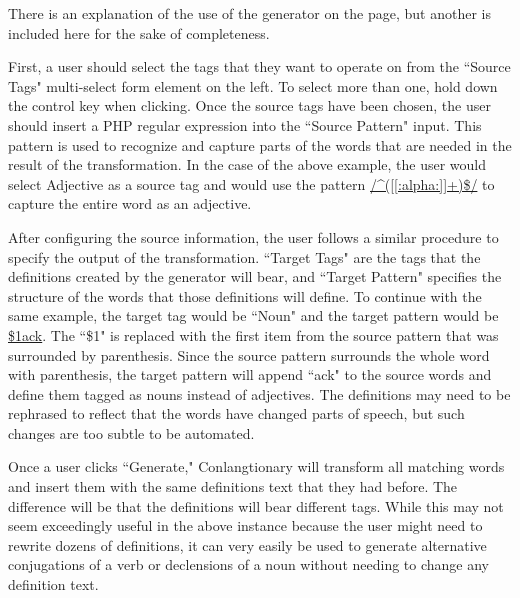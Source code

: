 There is an explanation of the use of the generator on the page, but another is included here for the sake of completeness.

First, a user should select the tags that they want to operate on from the ``Source Tags" multi-select form element on the left. To select more than one, hold down the control key when clicking. Once the source tags have been chosen, the user should insert a PHP regular expression into the ``Source Pattern" input. This pattern is used to recognize and capture parts of the words that are needed in the result of the transformation. In the case of the above example, the user would select Adjective as a source tag and would use the pattern \url{/^([[:alpha:]]+)$/} to capture the entire word as an adjective.

After configuring the source information, the user follows a similar procedure to specify the output of the transformation. ``Target Tags" are the tags that the definitions created by the generator will bear, and ``Target Pattern" specifies the structure of the words that those definitions will define. To continue with the same example, the target tag would be ``Noun" and the target pattern would be \url{$1ack}. The ``\$1" is replaced with the first item from the source pattern that was surrounded by parenthesis. Since the source pattern surrounds the whole word with parenthesis, the target pattern will append ``ack" to the source words and define them tagged as nouns instead of adjectives. The definitions may need to be rephrased to reflect that the words have changed parts of speech, but such changes are too subtle to be automated.

Once a user clicks ``Generate," Conlangtionary will transform all matching words and insert them with the same definitions text that they had before. The difference will be that the definitions will bear different tags. While this may not seem exceedingly useful in the above instance because the user might need to rewrite dozens of definitions, it can very easily be used to generate alternative conjugations of a verb or declensions of a noun without needing to change any definition text.
